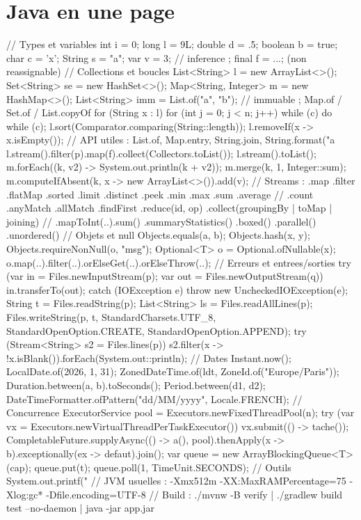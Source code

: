 \section{Java en une page}

\begin{codejava}
// Types et variables
int i = 0; long l = 9L; double d = .5; boolean b = true; char c = 'x'; String s = "a";
var v = 3;                                  // inference ; final f = ...; (non reassignable)
// Collections et boucles
List<String> l = new ArrayList<>(); Set<String> se = new HashSet<>(); Map<String, Integer> m = new HashMap<>();
List<String> imm = List.of("a", "b");       // immuable ; Map.of / Set.of / List.copyOf
for (String x : l) { } for (int j = 0; j < n; j++) { } while (c) { } do { } while (c);
l.sort(Comparator.comparing(String::length)); l.removeIf(x -> x.isEmpty());
// API utiles : List.of, Map.entry, String.join, String.format("a %
l.stream().filter(p).map(f).collect(Collectors.toList()); l.stream().toList();
m.forEach((k, v2) -> System.out.println(k + v2)); m.merge(k, 1, Integer::sum);
m.computeIfAbsent(k, x -> new ArrayList<>()).add(v);
// Streams : .map .filter .flatMap .sorted .limit .distinct .peek .min .max .sum .average
// .count .anyMatch .allMatch .findFirst .reduce(id, op) .collect(groupingBy | toMap | joining)
// .mapToInt(..).sum() .summaryStatistics() .boxed() .parallel() .unordered()
// Objets et null
Objects.equals(a, b); Objects.hash(x, y); Objects.requireNonNull(o, "msg");
Optional<T> o = Optional.ofNullable(x); o.map(..).filter(..).orElseGet(..).orElseThrow(..);
// Erreurs et entrees/sorties
try (var in = Files.newInputStream(p); var out = Files.newOutputStream(q)) { in.transferTo(out); }
catch (IOException e) { throw new UncheckedIOException(e); }
String t = Files.readString(p); List<String> ls = Files.readAllLines(p);
Files.writeString(p, t, StandardCharsets.UTF_8, StandardOpenOption.CREATE, StandardOpenOption.APPEND);
try (Stream<String> s2 = Files.lines(p)) { s2.filter(x -> !x.isBlank()).forEach(System.out::println); }
// Dates
Instant.now(); LocalDate.of(2026, 1, 31); ZonedDateTime.of(ldt, ZoneId.of("Europe/Paris"));
Duration.between(a, b).toSeconds(); Period.between(d1, d2); DateTimeFormatter.ofPattern("dd/MM/yyyy", Locale.FRENCH);
// Concurrence
ExecutorService pool = Executors.newFixedThreadPool(n);
try (var vx = Executors.newVirtualThreadPerTaskExecutor()) { vx.submit(() -> tache()); }
CompletableFuture.supplyAsync(() -> a(), pool).thenApply(x -> b).exceptionally(ex -> defaut).join();
var queue = new ArrayBlockingQueue<T>(cap); queue.put(t); queue.poll(1, TimeUnit.SECONDS);
// Outils
System.out.printf("%
// JVM usuelles : -Xmx512m -XX:MaxRAMPercentage=75 -Xlog:gc* -Dfile.encoding=UTF-8
// Build : ./mvnw -B verify | ./gradlew build test --no-daemon | java -jar app.jar
\end{codejava}

